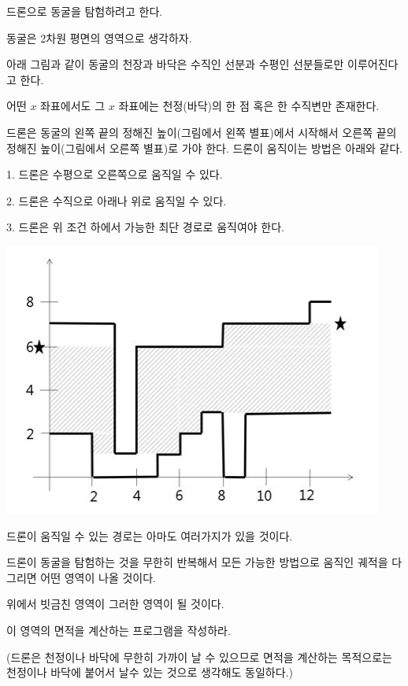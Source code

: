 \documentclass [12pt] {oblivoir}
\begin{document}
드론으로 동굴을 탐험하려고 한다.

동굴은 2차원 평면의 영역으로 생각하자.

\vspace{3mm}

아래 그림과 같이 동굴의 천장과 바닥은 수직인 선분과 수평인 선분들로만 이루어진다고 한다.

어떤 $x$ 좌표에서도 그 $x$ 좌표에는 천정(바닥)의 한 점 혹은 한 수직변만 존재한다.

드론은 동굴의 왼쪽 끝의 정해진 높이(그림에서 왼쪽 별표)에서 시작해서 오른쪽 끝의 정해진 높이(그림에서 오른쪽 별표)로 가야 한다. 드론이 움직이는 방법은 아래와 같다.

\vspace{3mm}

1.    드론은 수평으로 오른쪽으로 움직일 수 있다.

2.    드론은 수직으로 아래나 위로 움직일 수 있다.

3.    드론은 위 조건 하에서 가능한 최단 경로로 움직여야 한다.

\includegraphics[scale=0.5]{r2_n3.png}

\vspace{3mm}


드론이 움직일 수 있는 경로는 아마도 여러가지가 있을 것이다.

드론이 동굴을 탐험하는 것을 무한히 반복해서 모든 가능한 방법으로 움직인 궤적을 다 그리면 어떤 영역이 나올 것이다.

위에서 빗금친 영역이 그러한 영역이 될 것이다.

이 영역의 면적을 계산하는 프로그램을 작성하라.

(드론은 천정이나 바닥에 무한히 가까이 날 수 있으므로 면적을 계산하는 목적으로는 천정이나 바닥에 붙어서 날수 있는 것으로 생각해도 동일하다.)
\end{document}

